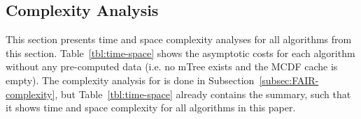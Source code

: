 \subsection{Complexity Analysis}
\begin{table}[t!]
	\tablemargin
	\caption{Time complexity for all algorithms without pre-computed results.\label{tbl:time-space}}
	\vspace{-4mm}
\end{table}

This section presents time and space complexity analyses for all algorithms from this section.
%
Table~\ref{tbl:time-space} shows the asymptotic costs for each algorithm without any pre-computed data (i.e. no mTree exists and the MCDF cache is empty).
%
The complexity analysis for \algoFAIR is done in Subsection~\ref{subsec:FAIR-complexity}, but Table~\ref{tbl:time-space} already contains the summary, such that it shows time and space complexity for all algorithms in this paper.

